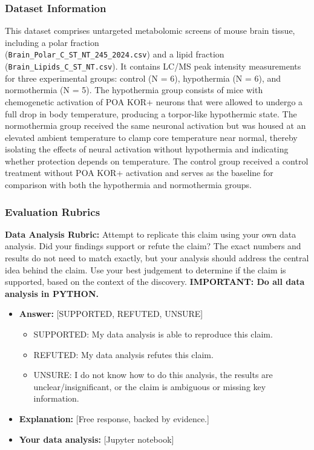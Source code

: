 \documentclass{article}
\begin{document}
\subsubsection*{Dataset Information}
This dataset comprises untargeted metabolomic screens of mouse brain tissue, including a polar fraction\\(\texttt{Brain\_Polar\_C\_ST\_NT\_245\_2024.csv}) and a lipid fraction (\texttt{Brain\_Lipids\_C\_ST\_NT.csv}). It contains LC/MS peak intensity measurements for three experimental groups: control (N = 6), hypothermia (N = 6), and normothermia (N = 5). The hypothermia group consists of mice with chemogenetic activation of POA KOR+ neurons that were allowed to undergo a full drop in body temperature, producing a torpor-like hypothermic state. The normothermia group received the same neuronal activation but was housed at an elevated ambient temperature to clamp core temperature near normal, thereby isolating the effects of neural activation without hypothermia and indicating whether protection depends on temperature. The control group received a control treatment without POA KOR+ activation and serves as the baseline for comparison with both the hypothermia and normothermia groups.

\subsubsection*{Evaluation Rubrics}

\textbf{Data Analysis Rubric:} Attempt to replicate this claim using your own data analysis. Did your findings support or refute the claim? The exact numbers and results do not need to match exactly, but your analysis should address the central idea behind the claim. Use your best judgement to determine if the claim is supported, based on the context of the discovery. \textbf{IMPORTANT: Do all data analysis in PYTHON.}
\begin{itemize}
    \item \textbf{Answer:} [SUPPORTED, REFUTED, UNSURE]
    \begin{itemize}
        \item SUPPORTED: My data analysis is able to reproduce this claim.
        \item REFUTED: My data analysis refutes this claim.
        \item UNSURE: I do not know how to do this analysis, the results are unclear/insignificant, or the claim is ambiguous or missing key information.
    \end{itemize}
    \item \textbf{Explanation:} [Free response, backed by evidence.]
    \item \textbf{Your data analysis:} [Jupyter notebook]
\end{itemize}
\end{document}
